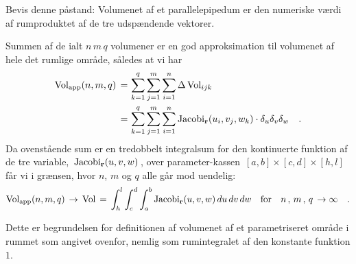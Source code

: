 \begin{exercise}
Bevis denne påstand: Volumenet af et
parallelepipedum er den numeriske værdi af
rumproduktet af de tre udspændende vektorer.
\end{exercise}

Summen af de ialt $n\,m\,q$ volumener er en god approksimation
til volumenet af hele det rumlige område, således at vi har
\begin{equation}
\begin{aligned}
 \operatorname{Vol}_{\operatorname{app}}(n,m,q)\, = \,
&\sum_{k=1}^{q}\sum_{j=1}^{m}\sum_{i=1}^{n} \Delta \operatorname{Vol}_{ijk} \,
\\ = \, &\sum_{k=1}^{q}\sum_{j=1}^{m}\sum_{i=1}^{n} \operatorname{Jacobi}_{\bf r}(u_{i}, v_{j}, w_{k})\cdot \delta_{u} \delta_{v} \delta_{w}
\quad.
\end{aligned}
\end{equation}
Da ovenstående sum er en tredobbelt integralsum for den kontinuerte
funktion af de tre variable, $\, \operatorname{Jacobi}_{\bf r}(u, v,w)\, $, over parameter-kassen $\, [a,
b]\times[c, d]\times[h,l]\, $ får vi i grænsen, hvor $n$, $m$ og $q$
alle går mod uendelig:
\begin{equation}
\operatorname{Vol}_{\operatorname{app}}(n,m,q)\,  \to \, \operatorname{Vol}\, = \, \int_{h}^{l}\int_{c}^{d}
\int_{a}^{b} \operatorname{Jacobi}_{\bf r}(u, v, w) \,du \, dv \, dw \quad
\text{for} \quad n\, ,  \, m\, , \,q \,   \to \infty \quad.
\end{equation}

Dette er begrundelsen for definitionen af volumenet af et
parametriseret område i rummet som angivet ovenfor, nemlig som
rumintegralet af den konstante funktion $1$.



